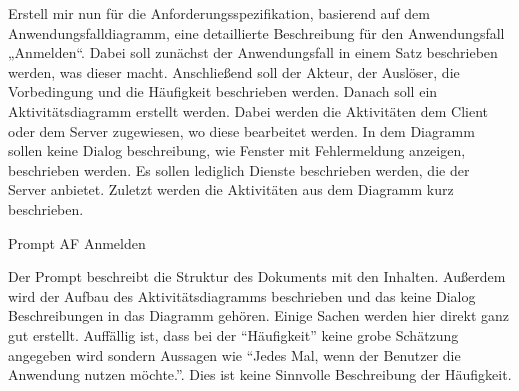 \begin{prompt}[H]
    \begin{tcolorbox}[colback=gray!20, colframe=gray!20, boxrule=0pt, sharp corners] 
        Erstell mir nun für die Anforderungsspezifikation, basierend auf dem Anwendungsfalldiagramm, eine detaillierte Beschreibung für den Anwendungsfall „Anmelden“. Dabei 
        soll zunächst der Anwendungsfall in einem Satz beschrieben werden, was dieser macht. Anschließend soll der Akteur, der Auslöser, die Vorbedingung und die Häufigkeit 
        beschrieben werden. Danach soll ein Aktivitätsdiagramm erstellt werden. Dabei werden die Aktivitäten dem Client oder dem Server zugewiesen, wo diese bearbeitet werden. 
        In dem Diagramm sollen keine Dialog beschreibung, wie Fenster mit Fehlermeldung anzeigen, beschrieben werden. Es sollen lediglich Dienste beschrieben werden, die der 
        Server anbietet. Zuletzt werden die Aktivitäten aus dem Diagramm kurz beschrieben.
        \vfill
    \end{tcolorbox}
    \caption{Prompt AF Anmelden}
    \label{Prompt AF Anmelden}
\end{prompt}

Der Prompt beschreibt die Struktur des Dokuments mit den Inhalten. Außerdem wird der Aufbau des Aktivitätsdiagramms beschrieben und das keine Dialog Beschreibungen 
in das Diagramm gehören. Einige Sachen werden hier direkt ganz gut erstellt. Auffällig ist, dass bei der ``Häufigkeit'' keine grobe Schätzung angegeben wird sondern 
Aussagen wie ``Jedes Mal, wenn der Benutzer die Anwendung nutzen möchte.''. Dies ist keine Sinnvolle Beschreibung der Häufigkeit.\\

